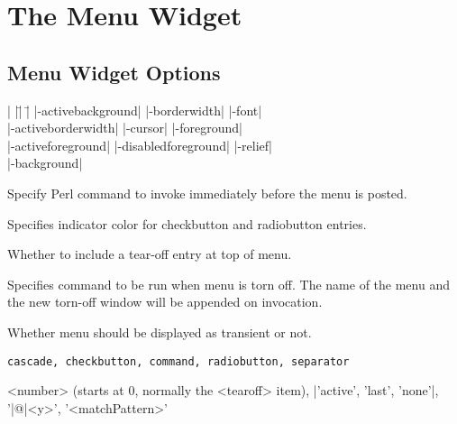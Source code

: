 
\section{The Menu Widget}

\subsection*{Menu Widget Options}
\begin{tabbing}
|                   |\=|                     |\= \kill
|-activebackground|  \> |-borderwidth|        \> |-font| \\
|-activeborderwidth| \> |-cursor|             \> |-foreground| \\
|-activeforeground|  \> |-disabledforeground| \> |-relief| \\
|-background| 	\\
\end{tabbing}

\vskip5pt
\begin{enum}{1cm}

Specify Perl command to invoke immediately before the menu is posted.

Specifies indicator color for checkbutton and radiobutton entries.

Whether to include a tear-off entry at top of menu.

Specifies command to be run when menu is torn off. The name of the
menu and the new torn-off window will be appended on invocation.

Whether menu should be displayed as transient or not.

\end{enum}
\begin{enum}{2.5cm}

 {\tt cascade, checkbutton, command, radiobutton, separator}

 <number> (starts at 0, normally the <tearoff> item), |'active', 'last', 'none'|, '|@|<y>', '<matchPattern>'

\end{enum}

